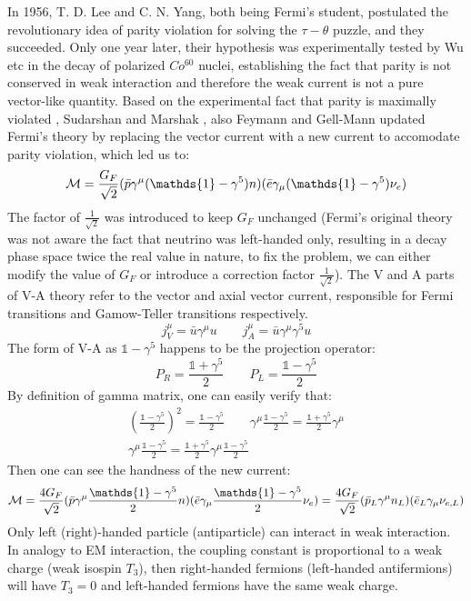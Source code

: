 In 1956, T. D. Lee and C. N. Yang, both being Fermi's student, postulated the
revolutionary idea of parity violation for solving the $\tau-\theta$ puzzle, 
and they succeeded. Only one year later, their hypothesis was experimentally tested
by Wu etc in the decay of polarized $Co^{60}$ nuclei, establishing the fact
that parity is not conserved in weak interaction and therefore the weak 
current is not a pure vector-like quantity. 
Based on the experimental fact that parity is maximally violated \cite{PhysRev.109.1015}, 
Sudarshan and Marshak \cite{PhysRev.109.1860.2}, 
also Feymann and Gell-Mann \cite{PhysRev.109.193}
updated Fermi's theory by replacing the vector current with a new current to 
accomodate parity violation, which led us to:
\begin{equation}
    \CM = \frac{G_F}{\sqrt{2}}(\bar{p} \gamma^\mu(\mathds{1} - \gamma^5) n) (\bar{e} \gamma_\mu(\mathds{1} - \gamma^5) \nu_e)
\end{equation}
The factor of $\frac{1}{\sqrt{2}}$ was introduced to keep $G_F$ unchanged (Fermi's
original theory was not aware the fact that neutrino was left-handed only, resulting
in a decay phase space twice the real value in nature, to fix the problem, we can
either modify the value of $G_F$ or introduce a correction factor $\frac{1}{\sqrt{2}}$).
The V and A parts of V-A theory refer to the vector and axial vector current, 
responsible for Fermi transitions and Gamow-Teller transitions respectively.
\begin{equation}
    j_V^\mu = \bar{u}\gamma^\mu u   \qquad 
    j_A^\mu = \bar{u}\gamma^\mu\gamma^5 u   
\end{equation}
The form of V-A as $\mathds{1} - \gamma^5$ happens to be the projection operator:
\begin{equation}
    P_R = \frac{\mathds{1} + \gamma^5}{2}   \qquad P_L = \frac{\mathds{1} - \gamma^5}{2}
\end{equation}
By definition of gamma matrix, one can easily verify that:
\begin{equation}
    \begin{gathered}
	\left(\frac{\mathds{1} - \gamma^5}{2} \right)^2 = \frac{\mathds{1} - \gamma^5}{2} 
	\qquad 
	\gamma^\mu \frac{\mathds{1} - \gamma^5}{2} = \frac{\mathds{1} + \gamma^5}{2} \gamma^\mu \\
	\gamma^\mu \frac{\mathds{1} - \gamma^5}{2} = \frac{\mathds{1} + \gamma^5}{2} \gamma^\mu \frac{\mathds{1}-\gamma^5}{2}
    \end{gathered}
\end{equation}
Then one can see the handness of the new current:
\begin{equation}
    \CM = \frac{4G_F}{\sqrt{2}}(\bar{p} \gamma^\mu\frac{\mathds{1} - \gamma^5}{2} n) (\bar{e} \gamma_\mu\frac{\mathds{1} - \gamma^5}{2} \nu_e) 
    = \frac{4G_F}{\sqrt{2}}(\bar{p}_L \gamma^\mu n_L)(\bar{e}_L \gamma_\mu \nu_{e,L})
\end{equation}
Only left (right)-handed particle (antiparticle) can interact in weak interaction.
In analogy to EM interaction, the coupling constant is proportional to a weak
charge (weak isospin $T_3$), then right-handed fermions (left-handed antifermions) 
will have $T_3 = 0$ and left-handed fermions have the same weak charge. 

